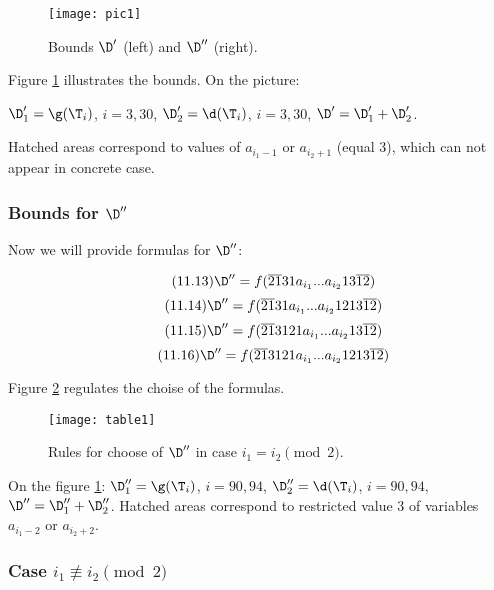 \begin{figure}[p]
	\centering
	\texttt{[image: pic1]}
	\caption{Bounds $\D'$ (left) and $\D''$ (right).}
	\label{pic1}
\end{figure}

Figure \ref{pic1} illustrates the bounds. On the picture:

$\D_1' = \g(\T_i)$, $i=3,30$,
$\D_2' = \d  (\T_i)$, $i=3,30$,
$\D' = \D_1' + \D_2'$.

Hatched areas correspond to values of $a_{i_1 - 1}$ or $a_{i_2 + 1}$ (equal 3),
which can not appear in concrete case.

\subsubsection{Bounds for $\D''$}
Now we will provide formulas for $\D''$:

\begin{equation}\tag{11.13}
	\D'' = f(\overline{21}31a_{i_1}... a_{i_2}13\overline{12})
\end{equation}
\begin{equation}\tag{11.14}
	\D'' = f(\overline{21}31a_{i_1}... a_{i_2}1213\overline{12})
\end{equation}
\begin{equation}\tag{11.15}
	\D'' = f(\overline{21}3121a_{i_1}... a_{i_2}13\overline{12})
\end{equation}
\begin{equation}\tag{11.16}
	\D'' = f(\overline{21}3121a_{i_1}... a_{i_2}1213\overline{12})
\end{equation}

Figure \ref{table1} regulates the choise of the formulas.

\begin{figure}[ht]
	\centering
	\texttt{[image: table1]}
	\caption{Rules for choose of $\D''$ in case $i_1 = i_2 \pmod 2$.}
	\label{table1}
\end{figure}

On the figure \ref{pic1}:
$\D_1'' = \g(\T_i)$, $i = 90, 94$,
$\D_2'' = \d  (\T_i)$, $i = 90, 94$,
$\D'' = \D_1'' + \D_2''$.
Hatched areas correspond to restricted value 3 of variables
$a_{i_1 - 2}$ or $a_{i_2 + 2}$.

\subsubsection{Case $i_1 \not\equiv i_2 \pmod 2$}

